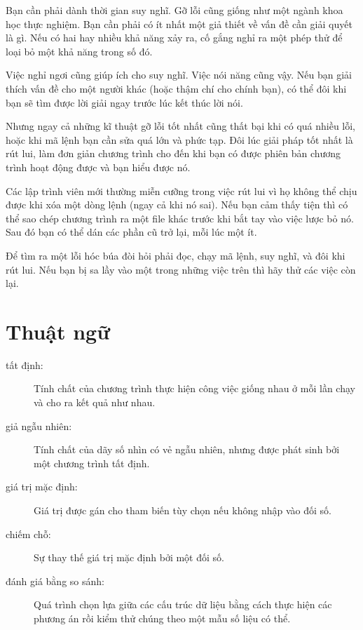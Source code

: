 \documentclass[11pt]{book}
\begin{document}
Bạn cần phải dành thời gian suy nghĩ. Gỡ lỗi cũng giống như một ngành
khoa học thực nghiệm. Bạn cần phải có ít nhất một giả thiết về vấn đề
cần giải quyết là gì. Nếu có hai hay nhiều khả năng xảy ra, cố gắng nghỉ ra một
phép thử để loại bỏ một khả năng trong số đó.

Việc nghỉ ngơi cũng giúp ích cho suy nghĩ. Việc nói năng cũng vậy.
Nếu bạn giải thích vấn đề cho một người khác (hoặc thậm chí cho chính bạn),
có thể đôi khi bạn sẽ tìm được lời giải ngay trước lúc kết thúc lời nói.

Nhưng ngay cả những kĩ thuật gỡ lỗi tốt nhất cũng thất bại khi có quá nhiều
lỗi, hoặc khi mã lệnh bạn cần sửa quá lớn và phức tạp. Đôi lúc giải pháp
tốt nhất là rút lui, làm đơn giản chương trình cho đến khi bạn có được
phiên bản chương trình hoạt động được và bạn hiểu được nó.

Các lập trình viên mới thường miễn cưỡng trong việc rút lui vì họ
không thể chịu được khi xóa một dòng lệnh (ngay cả khi nó sai).
Nếu bạn cảm thấy tiện thì có thể sao chép chương trình ra một file khác
trước khi bắt tay vào việc lược bỏ nó. Sau đó bạn có thể dán các phần
cũ trở lại, mỗi lúc một ít.

Để tìm ra một lỗi hóc búa đòi hỏi phải đọc, chạy mã lệnh, suy nghĩ,
và đôi khi rút lui. Nếu bạn bị sa lầy vào một trong những việc trên thì
hãy thử các việc còn lại.


\section{Thuật ngữ}

\begin{description}

\item[tất định:] Tính chất của chương trình thực hiện công việc giống nhau
ở mỗi lần chạy và cho ra kết quả như nhau.

\item[giả ngẫu nhiên:] Tính chất của dãy số nhìn có vẻ ngẫu nhiên, nhưng được
phát sinh bởi một chương trình tất định.

\item[giá trị mặc định:] Giá trị được gán cho tham biến tùy chọn nếu 
không nhập vào đối số.

\item[chiếm chỗ:] Sự thay thế giá trị mặc định bởi một đối số.

\item[đánh giá bằng so sánh:] Quá trình chọn lựa giữa các cấu trúc dữ liệu
bằng cách thực hiện các phương án rồi kiểm thử chúng theo một mẫu 
số liệu có thể.  

\end{description}
\end{document}
